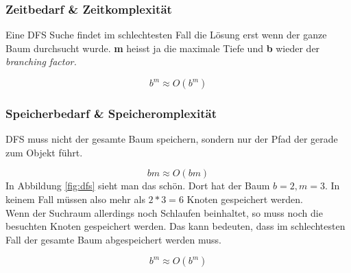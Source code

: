 \subsubsection{Zeitbedarf \& Zeitkomplexität}
Eine DFS Suche findet im schlechtesten Fall die Lösung erst wenn der ganze Baum durchsucht wurde. \textbf{m} heisst ja die maximale Tiefe und \textbf{b} wieder der \textit{branching factor.}

\begin{displaymath}
	b^m \approx O(b^m)
\end{displaymath}

\subsubsection{Speicherbedarf \& Speicheromplexität}
DFS muss nicht der gesamte Baum speichern, sondern nur der Pfad der gerade zum Objekt führt.

\begin{displaymath}
bm \approx O(bm)
\end{displaymath}
In Abbildung \ref{fig:dfs} sieht man das schön. Dort hat der Baum \(b=2, m=3\). In keinem Fall müssen also mehr als \(2*3=6\) Knoten gespeichert werden. \\ \newline
Wenn der Suchraum allerdings noch Schlaufen beinhaltet, so muss noch die besuchten Knoten gespeichert werden. Das kann bedeuten, dass im schlechtesten Fall der gesamte Baum abgespeichert werden muss.

\begin{displaymath}
b^m \approx O(b^m)
\end{displaymath}

